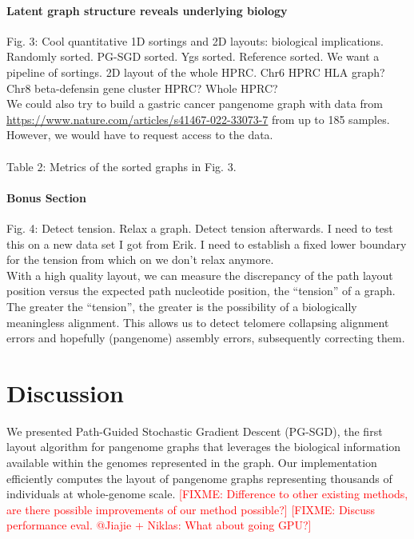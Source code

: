 \documentclass{bioinfo}
\theoremstyle{definition}
\newcommand{\red}[1]{{\textcolor{Red}{#1}}}
\newcommand{\FIXME}[1]{\red{[FIXME: #1]}}
\begin{document}
    \paragraph{Latent graph structure reveals underlying biology}
    Fig. 3: Cool quantitative 1D sortings and 2D layouts: biological implications.
    Randomly sorted. PG-SGD sorted. Ygs sorted. Reference sorted.
    We want a pipeline of sortings. 2D layout of the whole HPRC.
    Chr6 HPRC HLA graph? Chr8 beta-defensin gene cluster HPRC? Whole HPRC?
    \\
    We could also try to build a gastric cancer pangenome graph with data from \url{https://www.nature.com/articles/s41467-022-33073-7} from up to 185 samples.
    However, we would have to request access to the data.
    \\
    \\
    
    Table 2: Metrics of the sorted graphs in Fig. 3.
    

    \paragraph{Bonus Section}
    Fig. 4: Detect tension. Relax a graph. Detect tension afterwards.
    I need to test this on a new data set I got from Erik.
    I need to establish a fixed lower boundary for the tension from which on we don't relax anymore. \\
    With a high quality layout, we can measure the discrepancy of the path layout position versus the expected path nucleotide position, the “tension” of a graph.
    The greater the “tension”, the greater is the possibility of a biologically meaningless alignment.
    This allows us to detect telomere collapsing alignment errors and hopefully (pangenome) assembly errors, subsequently correcting them.
    
    \fi


	\section{Discussion}
	\label{sec:discussion}
	
	We presented Path-Guided Stochastic Gradient Descent (PG-SGD), the first layout algorithm for pangenome graphs that leverages the biological information available within the genomes represented in the graph.
	Our implementation efficiently computes the layout of pangenome graphs representing thousands of individuals at whole-genome scale.
	\FIXME{Difference to other existing methods, are there possible improvements of our method possible?}
	\FIXME{Discuss performance eval. @Jiajie + Niklas: What about going GPU?}
	
\end{document}

